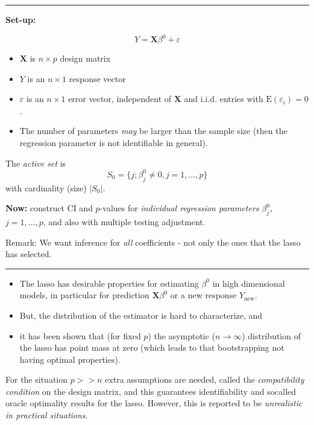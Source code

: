 \documentclass[
  letterpaper,
  DIV=11,
  numbers=noendperiod]{scrartcl}
\providecommand{\tightlist}{%
  \setlength{\itemsep}{0pt}\setlength{\parskip}{0pt}}\usepackage{longtable,booktabs,array}
\begin{document}
\begin{center}\rule{0.5\linewidth}{0.5pt}\end{center}

\textbf{Set-up:}

\[Y={\boldsymbol X} \beta^0 +\varepsilon\]

\begin{itemize}
\tightlist
\item
  \({\boldsymbol X}\) is \(n\times p\) design matrix
\item
  \(Y\) is an \(n \times 1\) response vector
\item
  \(\varepsilon\) is an \(n \times 1\) error vector, independent of
  \({\boldsymbol X}\) and i.i.d. entries with
  \(\text{E}(\varepsilon_i)=0\).
\item
  The number of parameters \emph{may} be larger than the sample size
  (then the regression parameter is not identifiable in general).
\end{itemize}

The \emph{active set} is \[S_0=\{ j; \beta_j^0 \neq 0,j=1,\ldots,p\}\]
with cardinality (size) \(\lvert S_0 \rvert\).

\textbf{Now:} construct CI and \(p\)-values for \emph{individual
regression parameters} \(\beta_j^0\), \(j=1,\ldots, p\), and also with
multiple testing adjustment.

Remark: We want inference for \emph{all} coefficients - not only the
ones that the lasso has selected.

\begin{center}\rule{0.5\linewidth}{0.5pt}\end{center}

\begin{itemize}
\tightlist
\item
  The lasso has desirable properties for estimating \(\beta^0\) in high
  dimensional models, in particular for prediction
  \({\boldsymbol X}\beta^0\) or a new response \(Y_{\text{new}}\).
\item
  But, the distribution of the estimator is hard to characterize, and
\item
  it has been shown that (for fixed \(p\)) the asymptotic
  (\(n\rightarrow \infty\)) distribution of the lasso has point mass at
  zero (which leads to that bootstrapping not having optimal
  properties).
\end{itemize}

For the situation \(p >> n\) extra assumptions are needed, called the
\emph{compatibility condition} on the design matrix, and this guarantees
identifiability and socalled oracle optimality results for the lasso.
However, this is reported to be \emph{unrealistic in practical
situations}.
\end{document}
